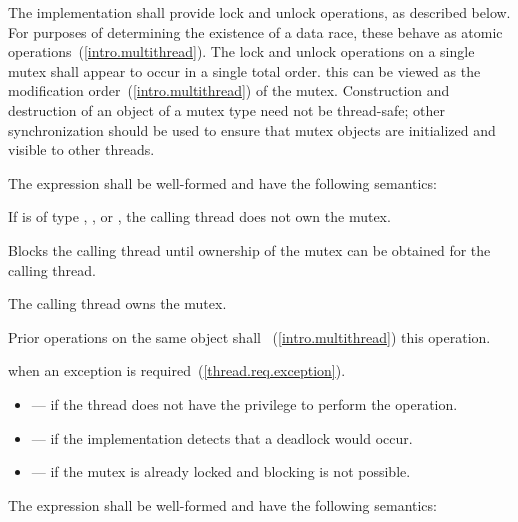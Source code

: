 \pnum
The implementation shall provide lock and unlock operations, as described below.
For purposes of determining the existence of a data race, these behave as
atomic operations~(\ref{intro.multithread}). The lock and unlock operations on
a single mutex shall appear to occur in a single total order. \enternote this
can be viewed as the modification order~(\ref{intro.multithread}) of the
mutex. \exitnote
\enternote Construction and
destruction of an object of a mutex type need not be thread-safe; other
synchronization should be used to ensure that mutex objects are initialized
and visible to other threads. \exitnote

\pnum
The expression  shall be well-formed and have the following semantics:

\begin{itemdescr}
\pnum
\requires If  is of type , , or
, the calling
thread does not own the mutex.

\pnum
\effects Blocks the calling thread until ownership of the mutex can be obtained for the calling thread.

\pnum
\postcondition The calling thread owns the mutex.

\pnum
\returntype {}

\pnum
\sync Prior  operations on the same object shall
~(\ref{intro.multithread}) this operation.

\pnum
\throws {} when
an exception is required~(\ref{thread.req.exception}).

\pnum \errors
\begin{itemize}
\item {} --- if the thread does not have the
privilege to perform the operation.

\item {} --- if the implementation detects
that a deadlock would occur.

\item {} --- if the mutex is already locked and blocking is not possible.
\end{itemize}
\end{itemdescr}

\pnum
The expression  shall be well-formed and have the following semantics:

